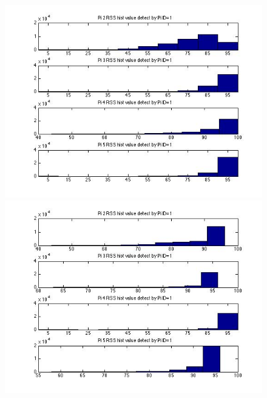 \documentclass[10pt,conference]{IEEEtran}
\begin{document}
\begin{figure}[htbp]
\centering
\begin{minipage}[t]{0.2\textwidth}
	\centering
	\includegraphics[scale=0.2]{time0-1}
\end{minipage}
\begin{minipage}[t]{0.2\textwidth}
	\centering
	\includegraphics[scale=0.2]{time0-2}
\end{minipage}
\begin{minipage}[t]{0.2\textwidth}
	\centering

\end{minipage}
\end{figure}
\end{document}
